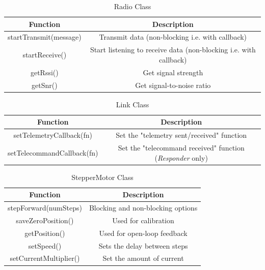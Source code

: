\begin{table}[!htb]
  \centering
  \caption{Radio Class}
  \renewcommand{\arraystretch}{1.2}
  \begin{tabular}{ |c|c| }
  \hline
  \textbf{Function}        & \textbf{Description}    \\
  \hline
    startTransmit(message)              & Transmit data (non-blocking i.e. with callback) \\
    startReceive()                      & Start listening to receive data (non-blocking i.e. with callback) \\
    getRssi()                           & Get signal strength \\
    getSnr()                            & Get signal-to-noise ratio \\
  \hline
  \end{tabular}
  \label{tab:radioUML}
\end{table}

\begin{table}[!htb]
  \centering
  \caption{Link Class}
  \renewcommand{\arraystretch}{1.2}
  \begin{tabular}{ |c|c| }
  \hline
  \textbf{Function}        & \textbf{Description}    \\
  \hline
  setTelemetryCallback(fn)                    & Set the "telemetry sent/received" function  \\
  setTelecommandCallback(fn)                  & Set the "telecommand received" function (\textit{Responder} only) \\
  \hline
  \end{tabular}
  \label{tab:linkUML}
\end{table}

\begin{table}[!htb]
  \centering
  \caption{StepperMotor Class}
  \renewcommand{\arraystretch}{1.2}
  \begin{tabular}{ |c|c| }
  \hline
  \textbf{Function}        & \textbf{Description}    \\
  \hline
    stepForward(numSteps)         & Blocking and non-blocking options \\
    saveZeroPosition()            & Used for calibration \\
    getPosition()                 & Used for open-loop feedback \\
    setSpeed()                    & Sets the delay between steps \\
    setCurrentMultiplier()        & Set the amount of current \\
  \hline
  \end{tabular}
  \label{tab:stepperMotorUML}
\end{table}

